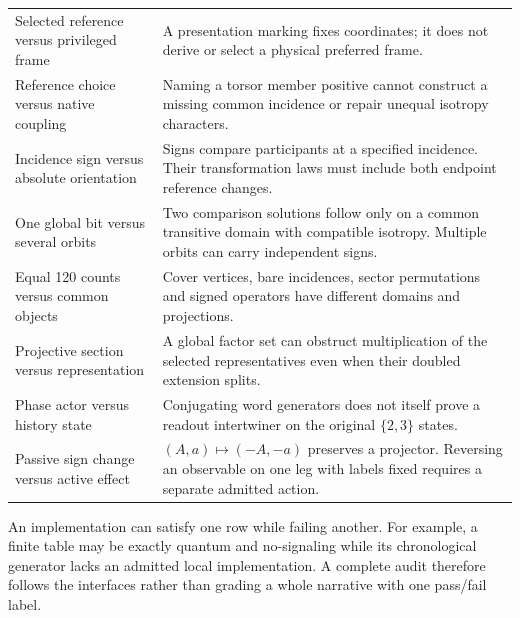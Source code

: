\begin{longtable}{@{}p{}p{}@{}}
Selected reference versus privileged frame & A presentation marking fixes coordinates; it does not derive or select a physical preferred frame. \\
Reference choice versus native coupling & Naming a torsor member positive cannot construct a missing common incidence or repair unequal isotropy characters. \\
Incidence sign versus absolute orientation & Signs compare participants at a specified incidence. Their transformation laws must include both endpoint reference changes. \\
One global bit versus several orbits & Two comparison solutions follow only on a common transitive domain with compatible isotropy. Multiple orbits can carry independent signs. \\
Equal 120 counts versus common objects & Cover vertices, bare incidences, sector permutations and signed operators have different domains and projections. \\
Projective section versus representation & A global factor set can obstruct multiplication of the selected representatives even when their doubled extension splits. \\
Phase actor versus history state & Conjugating word generators does not itself prove a readout intertwiner on the original $\{2,3\}$ states. \\
Passive sign change versus active effect & $(A,a)\mapsto(-A,-a)$ preserves a projector. Reversing an observable on one leg with labels fixed requires a separate admitted action. \\
\bottomrule
\end{longtable}

An implementation can satisfy one row while failing another. For example, a finite table may be exactly quantum and no-signaling while its chronological generator lacks an admitted local implementation. A complete audit therefore follows the interfaces rather than grading a whole narrative with one pass/fail label.

